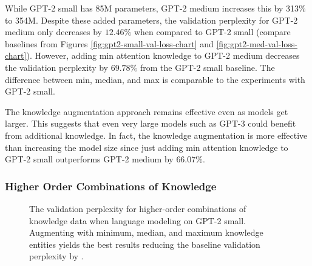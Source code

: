 \documentclass[phd,electronic,oneside,twosidetoc,letterpaper,chaptercenter,parttop,lof]{byumsphd}
\begin{document}
While GPT-2 small has 85M parameters, GPT-2 medium increases this by 313\% to 354M. 
Despite these added parameters, the validation perplexity for GPT-2 medium only decreases by $12.46\%$ when compared to GPT-2 small (compare baselines from Figures \ref{fig:gpt2-small-val-loss-chart} and \ref{fig:gpt2-med-val-loss-chart}).
However, adding min attention knowledge to GPT-2 medium decreases the validation perplexity by $69.78\%$ from the GPT-2 small baseline.
The difference between min, median, and max is comparable to the experiments with GPT-2 small.

The knowledge augmentation approach remains effective even as models get larger.
This suggests that even very large models such as GPT-3 \cite{brown2020language} could benefit from additional knowledge.
In fact, the knowledge augmentation is more effective than increasing the model size since just adding min attention knowledge to GPT-2 small outperforms GPT-2 medium by $66.07\%$.

\subsubsection{Higher Order Combinations of Knowledge}

\begin{figure}
\centering
{}  
    \caption[Higher-order combinations validation perplexity]{
        The validation perplexity for higher-order combinations of knowledge data when language modeling on GPT-2 small.
        Augmenting with minimum, median, and maximum knowledge entities yields the best results reducing the baseline validation perplexity by \LMLossPercentageDecrease.
    }
    \label{fig:higher-order}
\end{figure}
\end{document}
